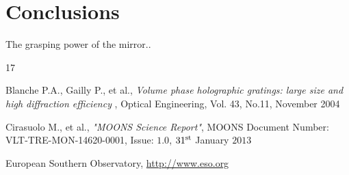 \documentclass{article}
\begin{document}
\chapter{Conclusions}
The grasping power of the mirror..


\begin{thebibliography}{17}

Blanche P.A., Gailly P., et al.,  \textit{Volume phase holographic gratings: large size and high diffraction efficiency} , Optical Engineering, Vol. 43, No.11, November 2004

Cirasuolo M., et al., \textit{"MOONS Science Report"}, MOONS Document Number: VLT-TRE-MON-14620-0001, Issue: $1.0$, $31^{\textup{st}}$ January $2013$

European Southern Observatory, \url{http://www.eso.org}

\end{thebibliography}
\end{document}
